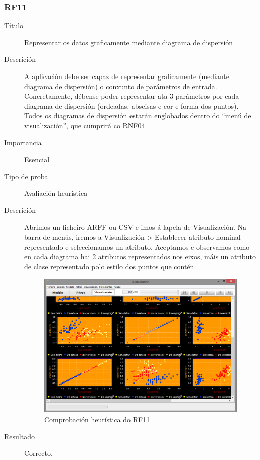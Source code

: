 \subsubsection*{RF11}
\begin{description}
\item[Título] \hfill
Representar os datos graficamente mediante diagrama de dispersión
\item[Descrición] \hfill
A aplicación debe ser capaz de representar graficamente (mediante diagrama de dispersión) o conxunto de parámetros de entrada. Concretamente, débense poder representar ata 3 parámetros por cada diagrama de dispersión (ordeadas, abscisas e cor e forma dos puntos). Todos os diagramas de dispersión estarán englobados dentro do ``menú de visualización'', que cumprirá co RNF04.
\item[Importancia] \hfill
Esencial
\item[Tipo de proba] \hfill
Avaliación heurística
\item[Descrición]
Abrimos un ficheiro ARFF ou CSV e imos á lapela de Visualización. Na barra de menús, iremos a Visualización \textgreater{} Establecer atributo nominal representado e seleccionamos un atributo. Aceptamos e observamos como en cada diagrama hai 2 atributos representados nos eixos, máis un atributo de clase representado polo estilo dos puntos que contén.
\begin{figure}
\centering
\includegraphics[width=\textwidth,height=\textheight,keepaspectratio]{figuras/RF11}
\caption{Comprobación heurística do RF11}
\label{RF11}
\end{figure}
\item[Resultado]
Correcto.
\end{description}

